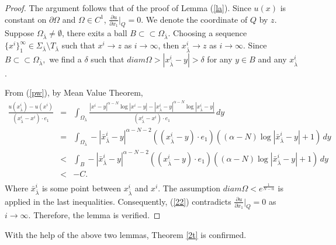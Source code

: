 \documentclass[12pt]{amsproc}
\theoremstyle{plain}
\numberwithin{equation}{section}
\begin{document}
\begin{proof}

The argument follows that of the proof of  Lemma (\ref{la}). Since
$u(x)$ is constant on $\partial\Omega$ and $\Omega\in C^1$,
 $\frac{\partial u}{\partial x_1}|_Q=0$. We denote the coordinate of $Q$ by $z$. Suppose
 $\Omega_{\bar\lambda}\not=\emptyset$, there exits a ball $
 B\subset\subset
 \Omega_{\bar\lambda}$.
 Choosing a sequence $\{x^i\}^\infty_1\in\Sigma_{\bar\lambda}\setminus T_{\bar\lambda}$ such that
$x^i\to z$ as $i\to \infty$,  then $x^i_{\bar\lambda}\to z$ as $i\to
\infty$. Since $ B\subset\subset
 \Omega_{\bar\lambda},$ we find a $ \delta$ such that $ diam
 \Omega>|x^i_{\bar\lambda}-y|>\delta$ for any $y\in B$ and any $x^i_{\bar\lambda}$.

From (\ref{pw}), by Mean Value Theorem,
\begin{eqnarray}
\frac{u(x^i_{\bar\lambda})-u(x^i)}{(x^i_{\bar\lambda}-x^i)\cdot
e_1}&=&\int_{\Omega_{\bar\lambda}}\frac{|x^i-y|^{\alpha-N}\log|x^i-y|
-|x^i_{\bar\lambda}-y|^{\alpha-N}\log|x^i_{\bar\lambda}-y|}
{(x^i_{\bar\lambda}-x^i)\cdot e_1} \,dy \nonumber \\
&=&\int_{\Omega_{\bar\lambda}} -|\bar
x^i_{\bar\lambda}-y|^{\alpha-N-2}((x^i_{\bar\lambda}-y)\cdot
e_1)((\alpha-N)\log|\bar x^i_{\bar\lambda}-y|+1) \,dy
\nonumber \\
&<&\int_{B} -|\bar
x^i_{\bar\lambda}-y|^{\alpha-N-2}((x^i_{\bar\lambda}-y)\cdot
e_1)((\alpha-N)\log|\bar x^i_{\bar\lambda}-y|+1) \,dy
\nonumber \\
 &<& -C. \nonumber \\
 \label{22}
\end{eqnarray}
Where $\bar x^i_{\bar\lambda}$ is some point between $
x^i_{\bar\lambda}$ and $x^i$. The assumption $diam \Omega<
e^{\frac{1}{N-\alpha}}$ is applied in the last inequalities.
Consequently, (\ref{22}) contradicts  $\frac{\partial u}{\partial
x_1}|_Q=0$ as $i\to\infty$. Therefore, the lemma is verified.
\end{proof}

With the help of the above two lemmas, Theorem \ref{2t} is
confirmed.

 
\end{document}
